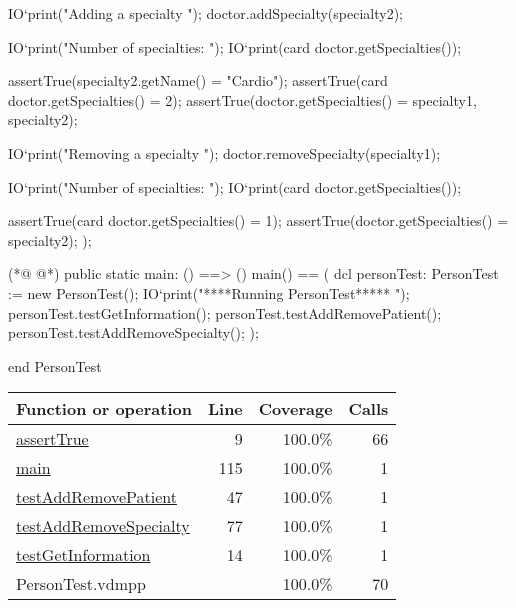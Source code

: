 \begin{vdmpp}[breaklines=true]
   IO`print("\n Adding a specialty \n");
   doctor.addSpecialty(specialty2);
   
   IO`print("\n Number of specialties: ");
   IO`print(card doctor.getSpecialties());
   
   assertTrue(specialty2.getName() = "Cardio");
   assertTrue(card doctor.getSpecialties() = 2);
   assertTrue(doctor.getSpecialties() = {specialty1, specialty2});
   
   IO`print("\n Removing a specialty \n");
   doctor.removeSpecialty(specialty1);
   
   IO`print("\n Number of specialties: ");
   IO`print(card doctor.getSpecialties());
   
   assertTrue(card doctor.getSpecialties() = 1);
   assertTrue(doctor.getSpecialties() = {specialty2});
  );
  
(*@
\label{main:115}
@*)
 public static main: () ==> ()
   main() == (
    dcl personTest: PersonTest := new PersonTest();
    IO`print("\n *****Running PersonTest***** \n");
    personTest.testGetInformation();
    personTest.testAddRemovePatient();
    personTest.testAddRemoveSpecialty();
   );
  
end PersonTest
\end{vdmpp}
\bigskip
\begin{longtable}{|l|r|r|r|}
\hline
Function or operation & Line & Coverage & Calls \\
\hline
\hline
\hyperref[assertTrue:9]{assertTrue} & 9&100.0\% & 66 \\
\hline
\hyperref[main:115]{main} & 115&100.0\% & 1 \\
\hline
\hyperref[testAddRemovePatient:47]{testAddRemovePatient} & 47&100.0\% & 1 \\
\hline
\hyperref[testAddRemoveSpecialty:77]{testAddRemoveSpecialty} & 77&100.0\% & 1 \\
\hline
\hyperref[testGetInformation:14]{testGetInformation} & 14&100.0\% & 1 \\
\hline
\hline
PersonTest.vdmpp & & 100.0\% & 70 \\
\hline
\end{longtable}

